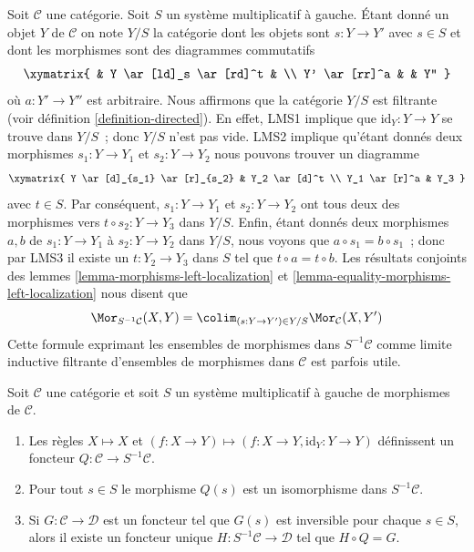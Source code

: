 \begin{remark}
\label{remark-left-localization-morphisms-colimit}
Soit $\mathcal{C}$ une catégorie. Soit $S$ un système multiplicatif à gauche.
Étant donné un objet $Y$ de $\mathcal{C}$ on note $Y/S$ la catégorie dont les
objets sont $s : Y \to Y'$ avec $s \in S$ et dont les morphismes sont des
diagrammes commutatifs
$$
\xymatrix{
& Y \ar[ld]_s \ar[rd]^t & \\
Y' \ar[rr]^a & & Y''
}
$$
où $a : Y' \to Y''$ est arbitraire. Nous affirmons que la catégorie $Y/S$ est
filtrante (voir définition \ref{definition-directed}). En effet, LMS1 implique
que $\text{id}_Y : Y \to Y$ se trouve dans $Y/S$ ; donc $Y/S$ n'est pas vide.
LMS2 implique qu'étant donnés deux morphismes $s_1 : Y \to Y_1$ et $s_2 : Y \to Y_2$ nous
pouvons trouver un diagramme
$$
\xymatrix{
Y \ar[d]_{s_1} \ar[r]_{s_2} & Y_2 \ar[d]^t \\
Y_1 \ar[r]^a & Y_3
}
$$
avec $t \in S$. Par conséquent, $s_1 : Y \to Y_1$ et $s_2 : Y \to Y_2$ ont
tous deux des morphismes vers $t \circ s_2 : Y \to Y_3$ dans $Y/S$. Enfin, étant
donnés deux morphismes $a, b$ de $s_1 : Y \to Y_1$ à $s_2 : Y \to Y_2$ dans
$Y/S$, nous voyons que $a \circ s_1 = b \circ s_1$ ; donc par LMS3 il existe
un $t : Y_2 \to Y_3$ dans $S$ tel que $t \circ a = t \circ b$. Les
résultats conjoints des lemmes \ref{lemma-morphisms-left-localization} et
\ref{lemma-equality-morphisms-left-localization} nous disent que
\begin{equation}
\label{equation-left-localization-morphisms-colimit}
\Mor_{S^{-1}\mathcal{C}}(X, Y) =
\colim_{(s : Y \to Y') \in Y/S} \Mor_\mathcal{C}(X, Y')
\end{equation}
Cette formule exprimant les ensembles de morphismes dans $S^{-1}\mathcal{C}$
comme limite inductive filtrante d'ensembles de morphismes dans $\mathcal{C}$
est parfois utile.
\end{remark}

\begin{lemma}
\label{lemma-properties-left-localization}
Soit $\mathcal{C}$ une catégorie et soit $S$ un système multiplicatif à gauche
de morphismes de $\mathcal{C}$.
\begin{enumerate}
\item Les règles $X \mapsto X$ et $(f : X \to Y) \mapsto (f : X \to Y, \text{id}_Y : Y \to Y)$ définissent un foncteur $Q : \mathcal{C} \to S^{-1}\mathcal{C}$.
\item Pour tout $s \in S$ le morphisme $Q(s)$ est un isomorphisme dans
$S^{-1}\mathcal{C}$.
\item Si $G : \mathcal{C} \to \mathcal{D}$ est un foncteur tel que $G(s)$ est
inversible pour chaque $s \in S$, alors il existe un foncteur unique $H : S^{-1}\mathcal{C} \to \mathcal{D}$ tel que $H \circ Q = G$.
\end{enumerate}
\end{lemma}

